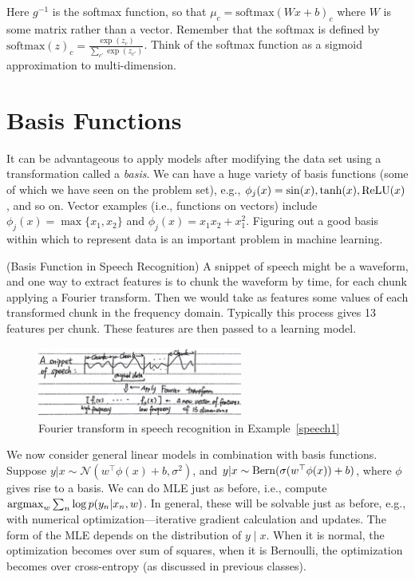 \documentclass{article}
\begin{document}
\begin{example}
    Here $g^{-1}$ is the softmax function, so that $\mu_c = \text{softmax}(Wx+b)_c$ where $W$ is some matrix rather than a vector.  Remember that the softmax is defined by $\text{softmax}(z)_c = \frac{\exp(z_c)}{\sum_{c'} \exp(z_{c'})}$.  Think of the softmax function as a sigmoid approximation to multi-dimension.
\end{example}

\section{Basis Functions}

It can be advantageous to apply models after modifying the data set using a transformation called a \emph{basis}.  We can have a huge variety of basis functions (some of which we have seen on the problem set), e.g., $\phi_j(x) = \sin(x), \tanh(x), \operatorname{ReLU}(x)$, and so on. Vector examples (i.e., functions on vectors) include $\phi_j(x) = \max\{x_1, x_2\}$ and $\phi_j(x) = x_1 x_2 + x_1^2$. Figuring out a good basis within which to represent data is an important problem in machine learning.

\begin{example}
\label{speech1}

  (Basis Function in Speech Recognition) A snippet of speech might be a waveform, and one way to extract features is to chunk the waveform by time, for each chunk applying a Fourier transform. Then we would take as features some values of each transformed chunk in the frequency domain.  Typically this process gives 13 features per chunk.  These features are then passed to a learning model.
    \begin{figure}[!ht]
    \centering
    \includegraphics[width = 0.6\textwidth]{speech1.jpg}
    \caption{Fourier transform in speech recognition in Example~\ref{speech1}}
    \end{figure}
\end{example}

We now consider general linear models in combination with basis functions. Suppose $y | x\sim\mathcal{N}(w^\top\phi(x) + b, \sigma^2)$, and $y | x\sim\operatorname{Bern}(\sigma(w^\top \phi(x)) + b)$, where $\phi$ gives rise to a basis. We can do MLE just as before, i.e., compute $\operatorname{argmax}_w \sum_n \log p(y_n | x_n, w)$. In general, these will be solvable just as before, e.g., with numerical optimization---iterative gradient calculation and updates. The form of the MLE depends on the distribution of $y \mid x$. When it is normal, the optimization becomes over sum of squares, when it is Bernoulli, the optimization becomes over cross-entropy (as discussed in previous classes).
\end{document}
